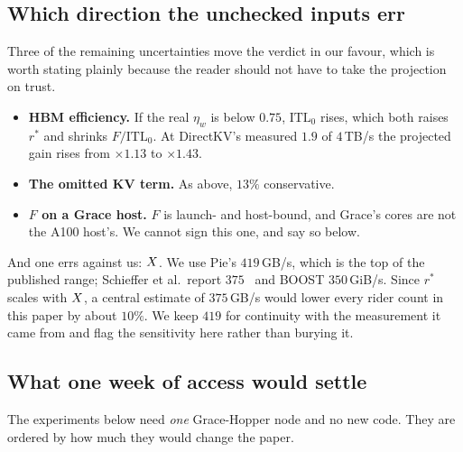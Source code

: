\subsection{Which direction the unchecked inputs err}

Three of the remaining uncertainties move the verdict in our favour, which is worth
stating plainly because the reader should not have to take the projection on trust.

\begin{itemize}\itemsep1pt \parskip0pt
\item \textbf{HBM efficiency.} If the real $\eta_w$ is below $0.75$,
  $\mathrm{ITL}_0$ rises, which both raises $r^{*}$ and shrinks
  $F/\mathrm{ITL}_0$. At DirectKV's measured $1.9$ of $4$\,TB/s the projected gain
  rises from $\times 1.13$ to $\times 1.43$.
\item \textbf{The omitted KV term.} As above, $13\%$ conservative.
\item \textbf{$F$ on a Grace host.} $F$ is launch- and host-bound, and Grace's cores
  are not the A100 host's. We cannot sign this one, and say so below.
\end{itemize}

And one errs against us: \textbf{$X$}. We use Pie's $419$\,GB/s, which is the
top of the published range; Schieffer et al.\ report $375$~\cite{schieffer2024} and
BOOST $350$\,GiB/s. Since $r^{*}$ scales with $X$, a central estimate of
$375$\,GB/s would lower every rider count in this paper by about $10\%$. We keep
$419$ for continuity with the measurement it came from and flag the sensitivity
here rather than burying it.

\subsection{What one week of access would settle}
\label{app:validation:ask}

The experiments below need \emph{one} Grace-Hopper node and no new code. They are
ordered by how much they would change the paper.

